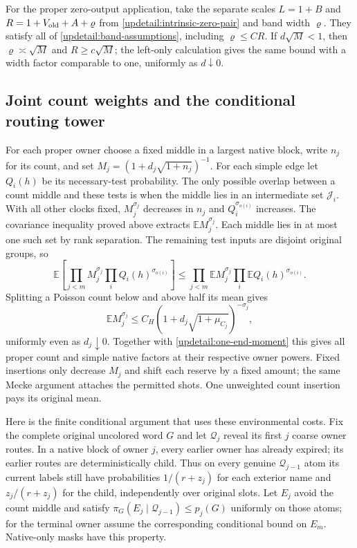 For the proper zero-output application, take the separate scales
$L=1+B$ and $R=1+V_{\rm old}+A+\varrho$ from
\eqref{updetail:intrinsic-zero-pair} and band width $\varrho$.
They satisfy all of \eqref{updetail:band-assumptions}, including
$\varrho\leq CR$. If $d\sqrt M<1$, then
$\varrho\asymp\sqrt M$ and $R\geq c\sqrt M$; the left-only
calculation gives the same bound with a width factor comparable to
one, uniformly as $d\downarrow0$.

\subsection{Joint count weights and the conditional routing tower}
\label{updetail:count-tower}
For each proper owner choose a fixed middle in a largest native block,
write $n_j$ for its count, and set
$M_j=(1+d_j\sqrt{1+n_j})^{-1}$.
For each simple edge let $Q_i(h)$ be its necessary-test probability.
The only possible overlap between a count middle and these tests is
when the middle lies in an intermediate set $\mathcal J_i$.
With all other clocks fixed, $M_j^{\sigma_j}$ decreases in $n_j$
and $Q_i^{\sigma_{o(i)}}$ increases. The covariance inequality proved
above extracts $\mathbb EM_j^{\sigma_j}$. Each middle lies in at
most one such set by rank separation. The remaining test inputs are
disjoint original groups, so
\[
 \mathbb E\left[\prod_{j<m}M_j^{\sigma_j}
                    \prod_iQ_i(h)^{\sigma_{o(i)}}\right]
 \leq\prod_{j<m}\mathbb EM_j^{\sigma_j}
       \prod_i\mathbb EQ_i(h)^{\sigma_{o(i)}}.
\]
Splitting a Poisson count below and above half its mean gives
\[
 \mathbb EM_j^{\sigma_j}
 \leq C_H(1+d_j\sqrt{1+\mu_{C_j}})^{-\sigma_j},
\]
uniformly even as $d_j\downarrow0$. Together with
\eqref{updetail:one-end-moment} this gives all proper count and simple
native factors at their respective owner powers. Fixed insertions
only decrease $M_j$ and shift each reserve by a fixed amount; the
same Mecke argument attaches the permitted shots. One unweighted
count insertion pays its original mean.

Here is the finite conditional argument that uses these environmental
costs. Fix the complete original uncolored word $G$ and let
$\mathcal Q_j$ reveal its first $j$ coarse owner routes. In a native
block of owner $j$, every earlier owner has already expired; its
earlier routes are deterministically child. Thus on every genuine
$\mathcal Q_{j-1}$ atom its current labels still have probabilities
$1/(r+z_j)$ for each exterior name and $z_j/(r+z_j)$ for the child,
independently over original slots. Let $E_j$ avoid the count middle
and satisfy
$\pi_G(E_j\mid\mathcal Q_{j-1})\leq p_j(G)$ uniformly on those
atoms; for the terminal owner assume the corresponding conditional
bound on $E_m$. Native-only masks have this property.

